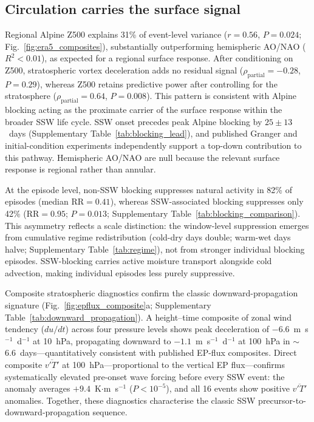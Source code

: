 \documentclass[11pt,letterpaper]{article}
\begin{document}
\subsection*{Circulation carries the surface signal}

Regional Alpine Z500 explains 31\% of event-level variance ($r = 0.56$, $P = 0.024$; Fig.~\ref{fig:era5_composites}), substantially outperforming hemispheric AO/NAO ($R^2 < 0.01$), as expected for a regional surface response\cite{Kretschmer2018}. After conditioning on Z500, stratospheric vortex deceleration adds no residual signal ($\rho_{\mathrm{partial}} = -0.28$, $P = 0.29$), whereas Z500 retains predictive power after controlling for the stratosphere ($\rho_{\mathrm{partial}} = 0.64$, $P = 0.008$). This pattern is consistent with Alpine blocking acting as the proximate carrier of the surface response within the broader SSW life cycle. SSW onset precedes peak Alpine blocking by $25 \pm 13$~days (Supplementary Table~\ref{tab:blocking_lead}), and published Granger and initial-condition experiments independently support a top-down contribution to this pathway\cite{Hitchcock2013,Baldwin2021,Kidston2015}. Hemispheric AO/NAO are null because the relevant surface response is regional rather than annular.

At the episode level, non-SSW blocking suppresses natural activity in 82\% of episodes (median $\mathrm{RR} = 0.41$), whereas SSW-associated blocking suppresses only 42\% ($\mathrm{RR} = 0.95$; $P = 0.013$; Supplementary Table~\ref{tab:blocking_comparison}). This asymmetry reflects a scale distinction: the window-level suppression emerges from cumulative regime redistribution (cold-dry days double; warm-wet days halve; Supplementary Table~\ref{tab:regime}), not from stronger individual blocking episodes. SSW-blocking carries active moisture transport alongside cold advection, making individual episodes less purely suppressive.

Composite stratospheric diagnostics confirm the classic downward-propagation signature (Fig.~\ref{fig:epflux_composite}a; Supplementary Table~\ref{tab:downward_propagation}). A height--time composite of zonal wind tendency ($du/dt$) across four pressure levels shows peak deceleration of $-6.6$~m~s$^{-1}$~d$^{-1}$ at 10~hPa, propagating downward to $-1.1$~m~s$^{-1}$~d$^{-1}$ at 100~hPa in $\sim$6.6~days---quantitatively consistent with published EP-flux composites\cite{Polvani2004,Butler2017}. Direct composite $\overline{v'T'}$ at 100~hPa---proportional to the vertical EP flux\cite{Polvani2004}---confirms systematically elevated pre-onset wave forcing before every SSW event: the anomaly averages $+9.4$~K$\cdot$m~s$^{-1}$ ($P < 10^{-5}$), and all 16 events show positive $\overline{v'T'}$ anomalies. Together, these diagnostics characterise the classic SSW precursor-to-downward-propagation sequence.
\end{document}
